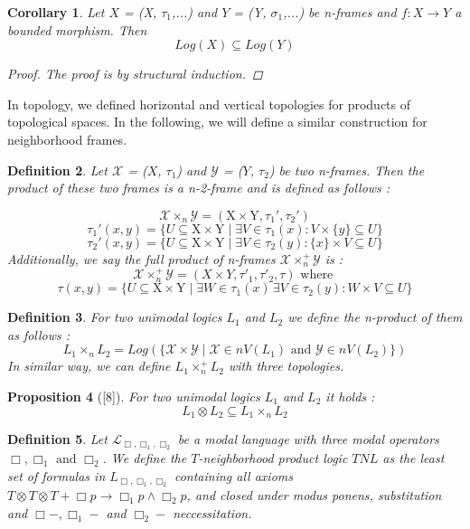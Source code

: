 \documentclass[12pt, a4paper]{scrartcl}
\newtheorem{definition}{Definition}[subsection]
\newtheorem{proposition}[definition]{Proposition}
\newtheorem{corollary}[definition]{Corollary}
\begin{document}
\begin{corollary}
     Let $X$ = (X, $\tau_1$,...) and $Y$ = (Y, $\sigma_1$,...) be n-frames and $f : X \rightarrow Y$ a bounded morphism. Then 
     $$Log(X) \subseteq Log(Y)$$
     \begin{proof}
        The proof is by structural induction.
     \end{proof}
\end{corollary}

\clearpage
In topology, we defined horizontal and vertical topologies for products of topological spaces.
 In the following, we will define a similar construction for neighborhood frames.

\begin{definition}
    Let $\mathcal{X}$ = ($X$, $\tau_1$) and $\mathcal{Y}$ = ($Y$, $\tau_2$) be two n-frames. Then the product of these two frames
    is a n-2-frame and is defined as follows : 

    $$ \mathcal{X} \times_n \mathcal{Y} = (\mbox{X} \times \mbox{Y}, \tau_1', \tau_2')$$   
    $$ \tau_1'(x,y) = \{ U \subseteq \mbox{X} \times \mbox{Y} \mid \exists V \in \tau_1(x) : V \times  \{ y \} \subseteq U \}$$
    $$ \tau_2'(x,y) = \{ U \subseteq \mbox{X} \times \mbox{Y} \mid \exists V \in \tau_2(y) : \{ x \} \times V \subseteq U \}$$
    Additionally, we say the full product of n-frames $\mathcal{X} \times^+_n \mathcal{Y}$ is :
    $$ \mathcal{X} \times^+_n \mathcal{Y} = (X \times Y, \tau'_1, \tau'_2, \tau)\mbox{ where }$$
    $$ \tau(x,y) = \{ U \subseteq \mbox{X} \times \mbox{Y} \mid \exists W \in \tau_1(x) \, \exists V \in \tau_2(y) : W \times V \subseteq U \}$$        
\end{definition}

\begin{definition}
    For two unimodal logics $L_1$ and $L_2$ we define the n-product of them as follows :
    $$ L_1 \times_n L_2 = Log(\{ \mathcal{X} \times \mathcal{Y} \mid \mathcal{X} \in nV(L_1) \mbox{ and } \mathcal{Y} \in nV(L_2) \})$$   
    In similar way, we can define $L_1 \times^+_n L_2$ with three topologies.     
\end{definition}

\begin{proposition}[\textnormal{[8]}]
    For two unimodal logics $L_1$ and $L_2$ it holds : 
    $$L_1 \otimes L_2 \subseteq L_1 \times_n L_2$$
\end{proposition}

\begin{definition}
    Let $\mathcal{L}_{\Box,\Box_1,\Box_2}$ be a modal language with three  modal operators $\Box, \Box_1 \mbox{ and } \Box_2$.
    We define the $T$-neighborhood product logic $\mathit{TNL}$ as the least set of formulas in $L_{\Box,\Box_1,\Box_2}$ 
    containing all axioms $T \otimes T \otimes T + \Box p \rightarrow \Box_1 p \land \Box_2 p$, and closed
    under modus ponens, substitution and $\Box- , \Box_1- $ and $\Box_2-$ neccessitation. 
\end{definition}
\end{document}
